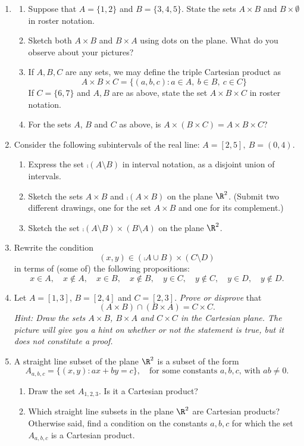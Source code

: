 \begin{enumerate}\renewcommand{\labelenumi}{\thesubsection.\theenumi}
  \item\begin{enumerate}
    \item Suppose that $A=\{1,2\}$ and $B=\{3,4,5\}$. State the sets $A\times B$ and $B\times \emptyset$ in roster notation.
    \item Sketch both $A\times B$ and $B\times A$ using dots on the plane. What do you observe about your pictures?
    \item If $A,B,C$ are any sets, we may define the triple Cartesian product as
    \[A\times B\times C=\big\{(a,b,c):a\in A,\ b\in B,\ c\in C\big\}\]
    If $C=\{6,7\}$ and $A,B$ are as above, state the set $A\times B\times C$ in roster notation.
    \item For the sets $A$, $B$ and $C$ as above, is $A \times (B \times C) = A \times B \times C$? 
  \end{enumerate}
  
  \item Consider the following subintervals of the real line: $A=[2,5],\ B=(0,4)$.
  \begin{enumerate}
    \item Express the set $\comp{(A\setminus B)}$ in interval notation, as a disjoint union of intervals.
     \item Sketch the sets $A\times B$ and $\comp{(A \times B)}$ on the plane $\R^2$. (Submit two different drawings, one for the set $A \times B$ and one for its complement.)
    \item Sketch the set $\comp{(A\setminus B)}\times (B\setminus A)$ on the plane $\R^2$.
  \end{enumerate}

	\item Rewrite the condition
	\[(x,y)\in (\comp{A}\cup B)\times (C\setminus D)\]
	in terms of (some of) the following propositions:
	\[x\in A,\quad x\not\in A,\quad x\in B,\quad x\not\in B,\quad y\in C,\quad y\not\in C,\quad y\in D,\quad y\not\in D.\]

	\item Let $A=[1,3]$, $B=[2,4]$ and $C=[2,3]$. \emph{Prove or disprove} that
	\[(A\times B)\cap (B\times A)=C\times C.\]
	\emph{Hint: Draw the sets $A\times B$, $B\times A$ and $C\times C$ in the Cartesian plane. The picture will give you a hint on whether or not the statement is true, but it does not constitute a proof.}
	
	\item A straight line subset of the plane $\R^2$ is a subset of the form
	  \[A_{a,b,c}=\{(x,y):ax+by=c\},\quad\text{for some constants $a,b,c$, with $ab\neq 0$.}\]
	  \begin{enumerate}
	  \item Draw the set $A_{1,2,3}$. Is it a Cartesian product?
	 	\item Which straight line subsets in the plane $\R^2$ are Cartesian products? Otherwise said, find a condition on the constants $a,b,c$ for which the set $A_{a,b,c}$ is a Cartesian product.
		\end{enumerate}
	

\end{enumerate}
